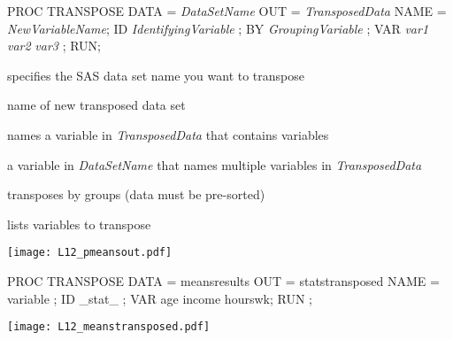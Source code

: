 \begin{frame}[fragile]
\hspace*{-0.3in}
\footnotesize
\begin{code}{.0}
PROC TRANSPOSE
   DATA = \emph{DataSetName} OUT = \emph{TransposedData} NAME = \emph{NewVariableName};
   ID \emph{IdentifyingVariable} ;
   BY \emph{GroupingVariable} ;
   VAR \emph{var1} \emph{var2} \emph{var3} ;
RUN;
\end{code}
\emp
\vskip5pt
\bi
{}
\item[\fbox{\ttt{DATA=}}] specifies the SAS data set name you want to transpose
\item[\fbox{\ttt{OUT=}}] name of new transposed data set
\item[\fbox{\ttt{NAME=}}] names a variable in \emph{TransposedData} that contains  variables
\emp
{} \hspace{0.05in} \emp
{}
\item[\fbox{\ttt{ID}}] a variable in \emph{DataSetName} that names multiple variables in \emph{TransposedData}
\item[\fbox{\ttt{BY}}] transposes by groups (data must be pre-sorted)
\item[\fbox{\ttt{VAR}}] lists variables to transpose
\item[]
\item[]
\emp
\ei
\end{frame}




\begin{frame}[fragile]
\hspace*{-0.3in}
\texttt{[image: L12\_pmeansout.pdf]}
\emp
\vskip5pt
\hspace*{-0.3in}
\footnotesize
\begin{code}{.0}
PROC TRANSPOSE
   DATA = meansresults
   OUT = statstransposed
   NAME = variable ;
   ID _stat_ ;
   VAR age income hourswk;
RUN ;
\end{code}
\emp
{} \hspace{0.05in} \emp
{}
\vspace{5ex}
\texttt{[image: L12\_meanstransposed.pdf]}
\emp
\end{frame}



